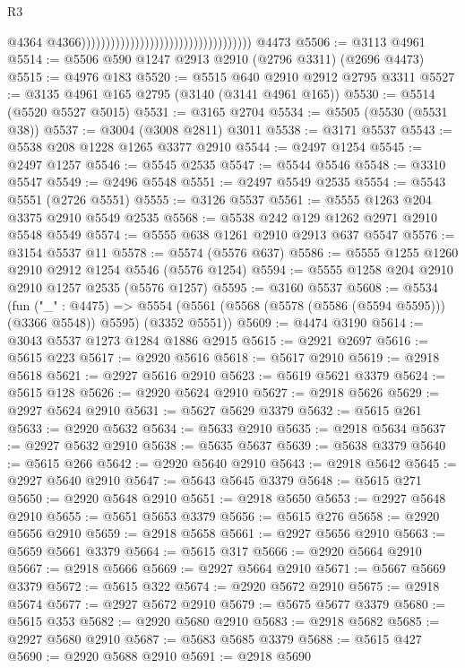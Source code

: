 \begin{lexlean}{R3}
\begin{coremodule}
                                                                          @4364
                                                                          @4366)))))))))))))))))))))))))))))))))))
    @4473
@5506 := @3113 @4961
@5514 := @5506 @590 @1247 @2913 @2910 (@2796 @3311) (@2696 @4473)
@5515 := @4976 @183
@5520 := @5515 @640 @2910 @2912 @2795 @3311
@5527 := @3135 @4961 @165 @2795 (@3140 (@3141 @4961 @165))
@5530 := @5514 (@5520 @5527 @5015)
@5531 := @3165 @2704
@5534 := @5505 (@5530 (@5531 @38))
@5537 := @3004 (@3008 @2811) @3011
@5538 := @3171 @5537
@5543 := @5538 @208 @1228 @1265 @3377 @2910
@5544 := @2497 @1254
@5545 := @2497 @1257
@5546 := @5545 @2535
@5547 := @5544 @5546
@5548 := @3310 @5547
@5549 := @2496 @5548
@5551 := @2497 @5549 @2535
@5554 := @5543 @5551 (@2726 @5551)
@5555 := @3126 @5537
@5561 := @5555 @1263 @204 @3375 @2910 @5549 @2535
@5568 := @5538 @242 @129 @1262 @2971 @2910 @5548 @5549
@5574 := @5555 @638 @1261 @2910 @2913 @637 @5547
@5576 := @3154 @5537 @11
@5578 := @5574 (@5576 @637)
@5586 := @5555 @1255 @1260 @2910 @2912 @1254 @5546 (@5576 @1254)
@5594 := @5555 @1258 @204 @2910 @2910 @1257 @2535 (@5576 @1257)
@5595 := @3160 @5537
@5608 := @5534
    (fun ("_" : @4475) =>
    @5554 (@5561 (@5568 (@5578 (@5586 (@5594 @5595))) (@3366 @5548)) @5595) (@3352 @5551))
@5609 := @4474 @3190
@5614 := @3043 @5537 @1273 @1284 @1886 @2915
@5615 := @2921 @2697
@5616 := @5615 @223
@5617 := @2920 @5616
@5618 := @5617 @2910
@5619 := @2918 @5618
@5621 := @2927 @5616 @2910
@5623 := @5619 @5621 @3379
@5624 := @5615 @128
@5626 := @2920 @5624 @2910
@5627 := @2918 @5626
@5629 := @2927 @5624 @2910
@5631 := @5627 @5629 @3379
@5632 := @5615 @261
@5633 := @2920 @5632
@5634 := @5633 @2910
@5635 := @2918 @5634
@5637 := @2927 @5632 @2910
@5638 := @5635 @5637
@5639 := @5638 @3379
@5640 := @5615 @266
@5642 := @2920 @5640 @2910
@5643 := @2918 @5642
@5645 := @2927 @5640 @2910
@5647 := @5643 @5645 @3379
@5648 := @5615 @271
@5650 := @2920 @5648 @2910
@5651 := @2918 @5650
@5653 := @2927 @5648 @2910
@5655 := @5651 @5653 @3379
@5656 := @5615 @276
@5658 := @2920 @5656 @2910
@5659 := @2918 @5658
@5661 := @2927 @5656 @2910
@5663 := @5659 @5661 @3379
@5664 := @5615 @317
@5666 := @2920 @5664 @2910
@5667 := @2918 @5666
@5669 := @2927 @5664 @2910
@5671 := @5667 @5669 @3379
@5672 := @5615 @322
@5674 := @2920 @5672 @2910
@5675 := @2918 @5674
@5677 := @2927 @5672 @2910
@5679 := @5675 @5677 @3379
@5680 := @5615 @353
@5682 := @2920 @5680 @2910
@5683 := @2918 @5682
@5685 := @2927 @5680 @2910
@5687 := @5683 @5685 @3379
@5688 := @5615 @427
@5690 := @2920 @5688 @2910
@5691 := @2918 @5690

\end{coremodule}
\end{lexlean}
